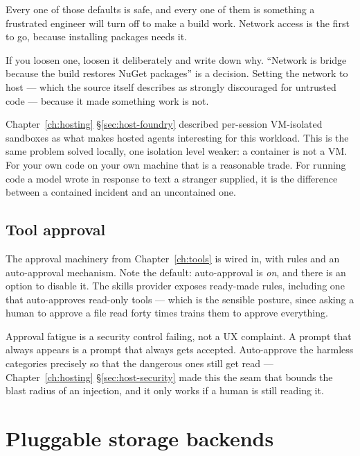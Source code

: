 \begin{warning}
Every one of those defaults is safe, and every one of them is something a
frustrated engineer will turn off to make a build work. Network access is the
first to go, because installing packages needs it.

If you loosen one, loosen it deliberately and write down why. ``Network is bridge
because the build restores NuGet packages'' is a decision. Setting the network to
host --- which the source itself describes as strongly discouraged for untrusted
code --- because it made something work is not.
\end{warning}

\begin{note}
Chapter~\ref{ch:hosting} \S\ref{sec:host-foundry} described per-session
VM-isolated sandboxes as what makes hosted agents interesting for this workload.
This is the same problem solved locally, one isolation level weaker: a container
is not a VM. For your own code on your own machine that is a reasonable trade.
For running code a model wrote in response to text a stranger supplied, it is
the difference between a contained incident and an uncontained one.
\end{note}

\subsection{Tool approval}

The approval machinery from Chapter~\ref{ch:tools} is wired in, with rules and
an auto-approval mechanism. Note the default: auto-approval is \emph{on}, and
there is an option to disable it. The skills provider exposes ready-made rules,
including one that auto-approves read-only tools --- which is the sensible
posture, since asking a human to approve a file read forty times trains them to
approve everything.

\begin{warning}
Approval fatigue is a security control failing, not a UX complaint. A prompt
that always appears is a prompt that always gets accepted. Auto-approve the
harmless categories precisely so that the dangerous ones still get read ---
Chapter~\ref{ch:hosting} \S\ref{sec:host-security} made this the seam that bounds
the blast radius of an injection, and it only works if a human is still
reading it.
\end{warning}

\section{Pluggable storage backends}
\label{sec:harness-storage}

